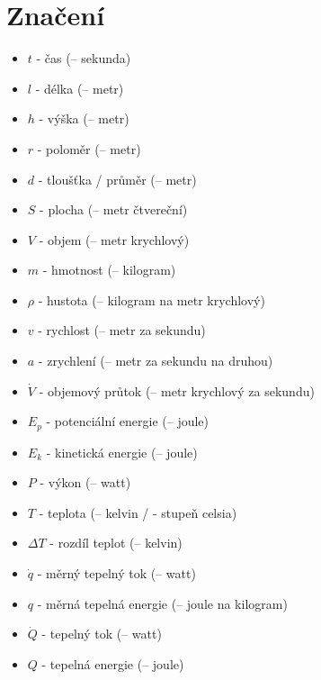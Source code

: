 \documentclass{article}
\begin{document}
\maketitle
\tableofcontents
\newpage



\section{Značení}

\begin{itemize}
    \item $t$ - čas (\ueqS \fs -- sekunda)
    \item $l$ - délka (\ueqM \fs -- metr)
    \item $h$ - výška (\ueqM \fs -- metr)
    \item $r$ - poloměr (\ueqM \fs -- metr)
    \item $d$ - tloušťka / průměr (\ueqM \fs -- metr)
    \item $S$ - plocha (\ueqMsq \fs -- metr čtvereční)
    \item $V$ - objem (\ueqMcu \fs -- metr krychlový)
    \item $m$ - hmotnost (\ueqKG \fs -- kilogram)
    \item $\rho$ - hustota (\ueqKGandMinvcu \fs -- kilogram na metr krychlový)
    \item $v$ - rychlost (\ueqMandSinv \fs -- metr za sekundu)
    \item $a$ - zrychlení (\ueqMandSinvsq \fs -- metr za sekundu na druhou)
    \item $\dot{V}$ - objemový průtok (\ueqMcuSinv \fs -- metr krychlový za sekundu)
    \item $E_p$ - potenciální energie (\ueqJ \fs -- joule)
    \item $E_k$ - kinetická energie (\ueqJ \fs -- joule)
    \item $P$ - výkon (\ueqW \fs -- watt)
    \item $T$ - teplota (\ueqK \fs -- kelvin / \ueqCELS \fs - stupeň celsia)
    \item $\Delta T$ - rozdíl teplot (\ueqK \fs -- kelvin)
    \item $\dot{q}$ - měrný tepelný tok (\ueqWandMinvsq \fs -- watt)
    \item $q$ - měrná tepelná energie (\ueqJandMinvsq \fs -- joule na kilogram)
    \item $\dot{Q}$ - tepelný tok (\ueqW \fs -- watt)
    \item $Q$ - tepelná energie (\ueqJ \fs -- joule)

\end{itemize}
\end{document}

